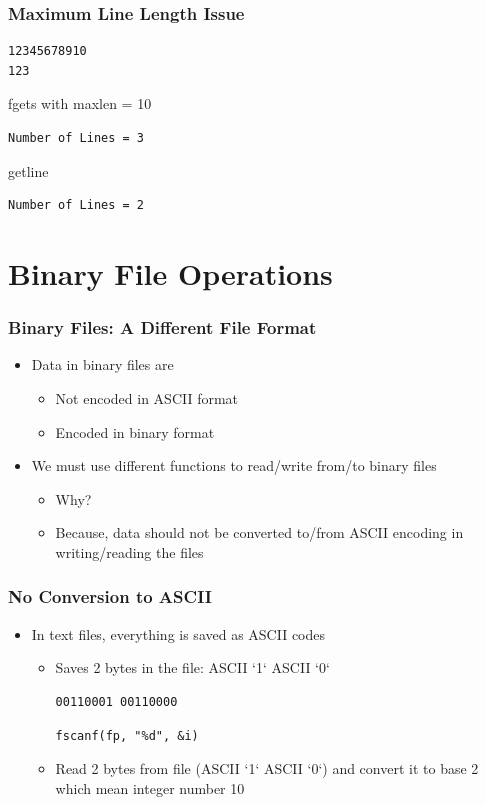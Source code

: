 \documentclass{../c-lecture}
\begin{document}
\begin{frame}[fragile]
  \frametitle{Maximum Line Length Issue}
  \begin{verbatim}
12345678910
123
  \end{verbatim}
  fgets with maxlen = 10
  \begin{verbatim}
Number of Lines = 3
  \end{verbatim}
  getline
  \begin{verbatim}
Number of Lines = 2
  \end{verbatim}
\end{frame}

\section{Binary File Operations}

\begin{frame}
  \frametitle{Binary Files: A Different File Format}
  \begin{itemize}
    \item Data in binary files are
    \begin{itemize}
      \item Not encoded in ASCII format
      \item Encoded in binary format
    \end{itemize}
    \item We must use different functions to read/write from/to binary files
    \begin{itemize}
      \item Why?
      \item
        Because, data should not be converted to/from ASCII encoding in
        writing/reading the files
    \end{itemize}
  \end{itemize}
\end{frame}

\begin{frame}[fragile]
  \frametitle{No Conversion to ASCII}
  \begin{itemize}
    \item In text files, everything is saved as ASCII codes
    \begin{itemize}
      \begin{verbatim}
fprintf(fp, "%d", 10)
      \end{verbatim}
      \item Saves 2 bytes in the file: ASCII `1` ASCII `0`
      \begin{verbatim}
00110001 00110000
      \end{verbatim}
      \begin{verbatim}
fscanf(fp, "%d", &i)
      \end{verbatim}
      \item
        Read 2 bytes from file (ASCII `1` ASCII `0`) and convert it to base 2
        which mean integer number 10
    \end{itemize}
  \end{itemize}
\end{frame}
\end{document}
